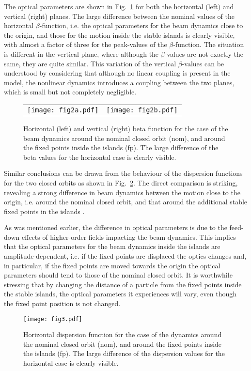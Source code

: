\documentclass{article}
\begin{document}
The optical parameters are shown in Fig.~\ref{optics} for both the horizontal (left) and vertical (right) planes. The large difference between the nominal values of the horizontal $\beta$-function, i.e. the optical parameters for the beam dynamics close to the origin, and those for the motion inside the stable islands is clearly visible, with almost a factor of three for the peak-values of the $\beta$-function. The situation is different in the vertical plane, where although the $\beta$-values are not exactly the same, they are quite similar. This variation of the vertical $\beta$-values can be understood by considering that although no linear coupling is present in the model, the nonlinear dynamics introduces a coupling between the two planes, which is small but not completely negligible. 
%
\begin{figure}[htb]
\begin{tabular}{cc}
  \texttt{[image: fig2a.pdf]} &
  \texttt{[image: fig2b.pdf]}
\end{tabular}	
\caption{\label{optics} Horizontal (left) and vertical (right) beta function for the case of the beam dynamics around the nominal closed orbit (nom), and around the fixed points inside the islands (fp). The large difference of the beta values for the horizontal case is clearly visible.}
\end{figure}
%

Similar conclusions can be drawn from the behaviour of the dispersion functions for the two closed orbits as shown in Fig.~\ref{disp}. The direct comparison is striking, revealing a strong difference in beam dynamics between the motion close to the origin, i.e. around the nominal closed orbit, and that around the additional stable fixed points in the islands . 

As was mentioned earlier, the difference in optical parameters is due to the feed-down effects of higher-order fields impacting the beam dynamics. This implies that the optical parameters for the beam dynamics inside the islands are amplitude-dependent, i.e. if the fixed points are displaced the optics changes and, in particular, if the fixed points are moved towards the origin the optical parameters should tend to those of the nominal closed orbit. It is worthwhile stressing that by changing the distance of a particle from the fixed points inside the stable islands, the optical parameters it experiences will vary, even though the fixed point position is not changed. 
%
\begin{figure}[htb]
\centering
  \texttt{[image: fig3.pdf]}
  \caption{\label{disp} Horizontal dispersion function for the case of the dynamics around the nominal closed orbit (nom), and around the fixed points inside the islands (fp). The large difference of the dispersion values for the horizontal case is clearly visible.}
\end{figure}
%
\end{document}
